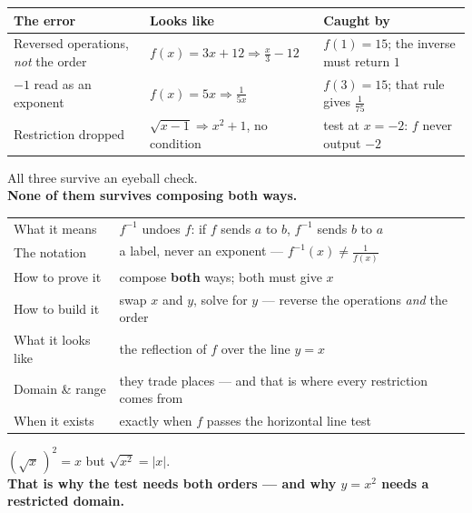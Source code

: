 \documentclass[aspectratio=169, 11pt]{beamer}
\begin{document}
\begin{frame}[t, plain]
  \begin{center}
  \footnotesize
  \renewcommand{\arraystretch}{1.5}
  \begin{tabular}{|l|l|l|}
  \hline
  \textbf{The error} & \textbf{Looks like} & \textbf{Caught by} \\ \hline
  Reversed operations, \emph{not} the order &
    $f(x)=3x+12 \Rightarrow \frac{x}{3}-12$ & $f(1)=15$; the inverse must return $1$ \\ \hline
  $-1$ read as an exponent &
    $f(x)=5x \Rightarrow \frac{1}{5x}$ & $f(3)=15$; that rule gives $\frac{1}{75}$ \\ \hline
  Restriction dropped &
    $\sqrt{x-1}\Rightarrow x^{2}+1$, no condition & test at $x=-2$: $f$ never output $-2$ \\ \hline
  \end{tabular}
  \end{center}
  \vspace{8pt}
  \begin{center}
    All three survive an eyeball check. \\[3pt]
    \textbf{None of them survives composing both ways.}
  \end{center}
\end{frame}

\begin{frame}[t, plain]
  \begin{center}
  \footnotesize
  \renewcommand{\arraystretch}{1.35}
  \begin{tabular}{ll}
  \hline
  What it means & $f^{-1}$ undoes $f$: if $f$ sends $a$ to $b$, $f^{-1}$ sends $b$ to $a$ \\
  The notation & a label, never an exponent --- $f^{-1}(x)\ne\frac{1}{f(x)}$ \\
  How to prove it & compose \textbf{both} ways; both must give $x$ \\
  How to build it & swap $x$ and $y$, solve for $y$ --- reverse the operations \emph{and} the order \\
  What it looks like & the reflection of $f$ over the line $y=x$ \\
  Domain \& range & they trade places --- and that is where every restriction comes from \\
  When it exists & exactly when $f$ passes the horizontal line test \\
  \hline
  \end{tabular}
  \end{center}
  \vspace{8pt}
  \begin{center}
    $\left(\sqrt{x}\,\right)^{2}=x$ but $\sqrt{x^{2}}=|x|$. \\[3pt]
    \textbf{That is why the test needs both orders --- and why $y=x^{2}$ needs a restricted domain.}
  \end{center}
\end{frame}
\end{document}
